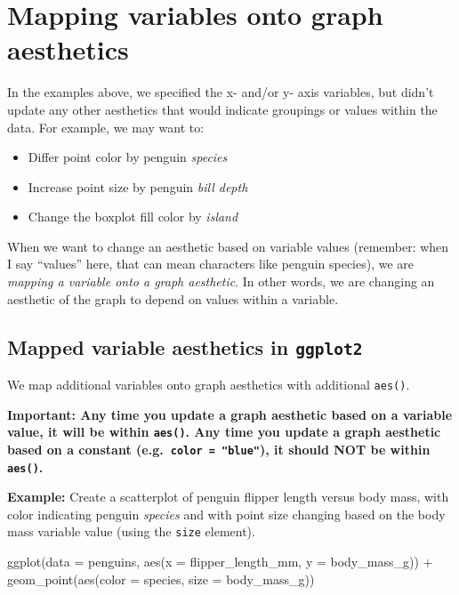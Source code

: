 \documentclass[
]{book}
\newenvironment{Shaded}{\begin{snugshade}}{\end{snugshade}}
\newcommand{\AttributeTok}[1]{\textcolor[rgb]{0.77,0.63,0.00}{#1}}
\newcommand{\FunctionTok}[1]{\textcolor[rgb]{0.00,0.00,0.00}{#1}}
\newcommand{\NormalTok}[1]{#1}
\newcommand{\SpecialCharTok}[1]{\textcolor[rgb]{0.00,0.00,0.00}{#1}}
\providecommand{\tightlist}{%
  \setlength{\itemsep}{0pt}\setlength{\parskip}{0pt}}
\begin{document}
\hypertarget{mapping-variables-onto-graph-aesthetics}{%
\section{Mapping variables onto graph aesthetics}\label{mapping-variables-onto-graph-aesthetics}}

In the examples above, we specified the x- and/or y- axis variables, but didn't update any other aesthetics that would indicate groupings or values within the data. For example, we may want to:

\begin{itemize}
\tightlist
\item
  Differ point color by penguin \emph{species}
\item
  Increase point size by penguin \emph{bill depth}
\item
  Change the boxplot fill color by \emph{island}
\end{itemize}

When we want to change an aesthetic based on variable values (remember: when I say ``values'' here, that can mean characters like penguin species), we are \emph{mapping a variable onto a graph aesthetic}. In other words, we are changing an aesthetic of the graph to depend on values within a variable.

\hypertarget{mapped-variable-aesthetics-in-ggplot2}{%
\subsection{\texorpdfstring{Mapped variable aesthetics in \texttt{ggplot2}}{Mapped variable aesthetics in ggplot2}}\label{mapped-variable-aesthetics-in-ggplot2}}

We map additional variables onto graph aesthetics with additional \texttt{aes()}.

\textbf{Important: Any time you update a graph aesthetic based on a variable value, it will be within \texttt{aes()}. Any time you update a graph aesthetic based on a constant (e.g.~\texttt{color\ =\ "blue"}), it should NOT be within \texttt{aes()}.}

\textbf{Example:} Create a scatterplot of penguin flipper length versus body mass, with color indicating penguin \emph{species} and with point size changing based on the body mass variable value (using the \texttt{size} element).

\begin{Shaded}
\begin{Highlighting}[]
\FunctionTok{ggplot}\NormalTok{(}\AttributeTok{data =}\NormalTok{ penguins, }\FunctionTok{aes}\NormalTok{(}\AttributeTok{x =}\NormalTok{ flipper\_length\_mm, }\AttributeTok{y =}\NormalTok{ body\_mass\_g)) }\SpecialCharTok{+}
  \FunctionTok{geom\_point}\NormalTok{(}\FunctionTok{aes}\NormalTok{(}\AttributeTok{color =}\NormalTok{ species, }\AttributeTok{size =}\NormalTok{ body\_mass\_g))}
\end{Highlighting}
\end{Shaded}
\end{document}
